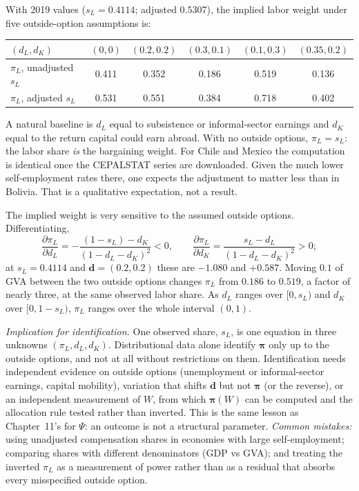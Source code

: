 \documentclass[../solutions_manual.tex]{subfiles}
\begin{document}
 With 2019 values ($s_L = 0.4114$; adjusted $0.5307$), the implied labor weight under five outside-option assumptions is:
\begin{center}
\begin{tabular}{lccccc}
\toprule
$(d_L, d_K)$ & $(0, 0)$ & $(0.2, 0.2)$ & $(0.3, 0.1)$ & $(0.1, 0.3)$ & $(0.35, 0.2)$ \\
\midrule
$\pi_L$, unadjusted $s_L$ & 0.411 & 0.352 & 0.186 & 0.519 & 0.136 \\
$\pi_L$, adjusted $s_L$ & 0.531 & 0.551 & 0.384 & 0.718 & 0.402 \\
\bottomrule
\end{tabular}
\end{center}
A natural baseline is $d_L$ equal to subsistence or informal-sector earnings and $d_K$ equal to the return capital could earn abroad. With no outside options, $\pi_L = s_L$: the labor share \emph{is} the bargaining weight. For Chile and Mexico the computation is identical once the CEPALSTAT series are downloaded. Given the much lower self-employment rates there, one expects the adjustment to matter less than in Bolivia. That is a qualitative expectation, not a result.

 The implied weight is very sensitive to the assumed outside options. Differentiating,
\[
\frac{\partial\pi_L}{\partial d_L} = -\frac{(1 - s_L) - d_K}{(1 - d_L - d_K)^2} < 0, \qquad \frac{\partial\pi_L}{\partial d_K} = \frac{s_L - d_L}{(1 - d_L - d_K)^2} > 0;
\]
at $s_L = 0.4114$ and $\boldsymbol{d} = (0.2, 0.2)$ these are $-1.080$ and $+0.587$. Moving $0.1$ of GVA between the two outside options changes $\pi_L$ from $0.186$ to $0.519$, a factor of nearly three, at the same observed labor share. As $d_L$ ranges over $[0, s_L)$ and $d_K$ over $[0, 1 - s_L)$, $\pi_L$ ranges over the whole interval $(0, 1)$.

\emph{Implication for identification.} One observed share, $s_L$, is one equation in three unknowns $(\pi_L, d_L, d_K)$. Distributional data alone identify $\boldsymbol{\pi}$ only up to the outside options, and not at all without restrictions on them. Identification needs independent evidence on outside options (unemployment or informal-sector earnings, capital mobility), variation that shifts $\boldsymbol{d}$ but not $\boldsymbol{\pi}$ (or the reverse), or an independent measurement of $W$, from which $\boldsymbol{\pi}(W)$ can be computed and the allocation rule tested rather than inverted. This is the same lesson as Chapter~11's for $\Psi$: an outcome is not a structural parameter. \emph{Common mistakes:} using unadjusted compensation shares in economies with large self-employment; comparing shares with different denominators (GDP vs GVA); and treating the inverted $\pi_L$ as a measurement of power rather than as a residual that absorbs every misspecified outside option.
\end{document}
